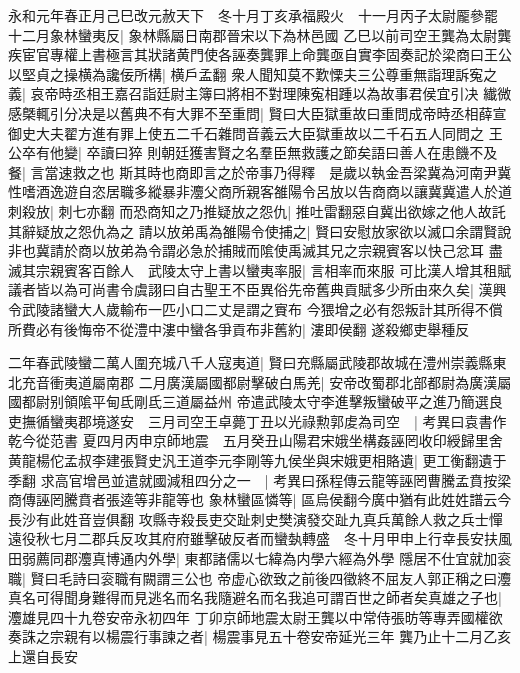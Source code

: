 永和元年春正月己巳改元赦天下　冬十月丁亥承福殿火　十一月丙子太尉龎參罷　十二月象林蠻夷反|{
	象林縣屬日南郡晉宋以下為林邑國}
乙巳以前司空王龔為太尉龔疾宦官專權上書極言其狀諸黄門使各誣奏龔罪上命龔亟自實李固奏記於梁商曰王公以堅貞之操横為讒佞所構|{
	横戶孟翻}
衆人聞知莫不歎慄夫三公尊重無詣理訴寃之義|{
	哀帝時丞相王嘉召詣廷尉主簿曰將相不對理陳寃相踵以為故事君侯宜引决}
纎微感槩輒引分决是以舊典不有大罪不至重問|{
	賢曰大臣獄重故曰重問成帝時丞相薛宣御史大夫翟方進有罪上使五二千石雜問音義云大臣獄重故以二千石五人同問之}
王公卒有他變|{
	卒讀曰猝}
則朝廷獲害賢之名羣臣無救護之節矣語曰善人在患饑不及餐|{
	言當速救之也}
斯其時也商即言之於帝事乃得釋　是歲以執金吾梁冀為河南尹冀性嗜酒逸遊自恣居職多縱暴非灋父商所親客雒陽令呂放以告商商以讓冀冀遣人於道刺殺放|{
	刺七亦翻}
而恐商知之乃推疑放之怨仇|{
	推吐雷翻惡自冀出欲嫁之他人故託其辭疑放之怨仇為之}
請以放弟禹為雒陽令使捕之|{
	賢曰安慰放家欲以滅口余謂賢說非也冀請於商以放弟為令謂必急於捕賊而隂使禹滅其兄之宗親賓客以快己忿耳}
盡滅其宗親賓客百餘人　武陵太守上書以蠻夷率服|{
	言相率而來服}
可比漢人增其租賦議者皆以為可尚書令虞詡曰自古聖王不臣異俗先帝舊典貢賦多少所由來久矣|{
	漢興令武陵諸蠻大人歲輸布一匹小口二丈是謂之賨布}
今猥增之必有怨叛計其所得不償所費必有後悔帝不從澧中漊中蠻各爭貢布非舊約|{
	漊即侯翻}
遂殺鄉吏舉種反

二年春武陵蠻二萬人圍充城八千人寇夷道|{
	賢曰充縣屬武陵郡故城在澧州崇義縣東北充音衝夷道屬南郡}
二月廣漢屬國都尉擊破白馬羌|{
	安帝改蜀郡北部都尉為廣漢屬國都尉别領隂平甸氐剛氐三道屬益州}
帝遣武陵太守李進擊叛蠻破平之進乃簡選良吏撫循蠻夷郡境遂安　三月司空王卓薨丁丑以光祿勲郭䖍為司空　|{
	考異曰袁書作乾今從范書}
夏四月丙申京師地震　五月癸丑山陽君宋娥坐構姦誣罔收印綬歸里舍黄龍楊佗孟叔李建張賢史汎王道李元李剛等九侯坐與宋娥更相賂遺|{
	更工衡翻遺于季翻}
求高官增邑並遣就國減租四分之一　|{
	考異曰孫程傳云龍等誣罔曹騰孟賁按梁商傳誣罔騰賁者張逵等非龍等也}
象林蠻區憐等|{
	區烏侯翻今廣中猶有此姓姓譜云今長沙有此姓音豈俱翻}
攻縣寺殺長吏交趾刺史樊演發交趾九真兵萬餘人救之兵士憚遠役秋七月二郡兵反攻其府府雖擊破反者而蠻埶轉盛　冬十月甲申上行幸長安扶風田弱薦同郡灋真博通内外學|{
	東都諸儒以七緯為内學六經為外學}
隱居不仕宜就加衮職|{
	賢曰毛詩曰衮職有闕謂三公也}
帝虚心欲致之前後四徵終不屈友人郭正稱之曰灋真名可得聞身難得而見逃名而名我隨避名而名我追可謂百世之師者矣真雄之子也|{
	灋雄見四十九卷安帝永初四年}
丁卯京師地震太尉王龔以中常侍張昉等專弄國權欲奏誅之宗親有以楊震行事諫之者|{
	楊震事見五十卷安帝延光三年}
龔乃止十二月乙亥上還自長安

